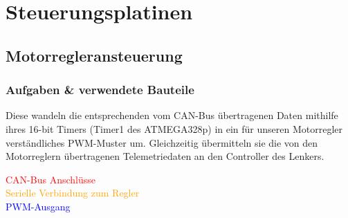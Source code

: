 \section{Steuerungsplatinen}
\subsection{Motorregleransteuerung}
\subsubsection{Aufgaben \& verwendete Bauteile}
Diese wandeln die entsprechenden vom CAN-Bus übertragenen Daten mithilfe ihres 16-bit Timers (Timer1 des ATMEGA328p) in ein für unseren Motorregler verständliches PWM-Muster um.
Gleichzeitig übermitteln sie die von den Motorreglern übertragenen Telemetriedaten an den Controller des Lenkers.

\begin{minipage}{8.5cm}
\end{minipage}
\begin{minipage}{7cm}
    \textcolor{red}{CAN-Bus Anschlüsse}\\
    \textcolor{orange}{Serielle Verbindung zum Regler}\\
    \textcolor{blue}{PWM-Ausgang}\\

\end{minipage}

